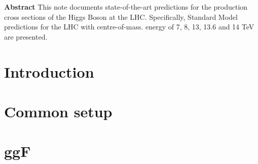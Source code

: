 \documentclass[11pt]{article}
\begin{document}
\begin{titlepage}
\begin{center}
           
           
           
           \textbf{}
  \end{center}
  
  \thispagestyle{empty}
  
  
  
  
  \mbox{}\vspace*{3em}
  \begin{center}
    \textbf{Abstract}
    This note documents state-of-the-art predictions for the production cross sections of the Higgs Boson at the LHC. 
    Specifically, Standard Model predictions for the LHC with centre-of-mass. energy of 7, 8, 13, 13.6 and 14 TeV are presented.
  \end{center}
\end{titlepage}
\newpage
\tableofcontents

\section{Introduction}
\label{sec:intro}


\section{Common setup}
\label{sec:setup}


\section{ggF}
\label{sec:ggF}

\end{document}
